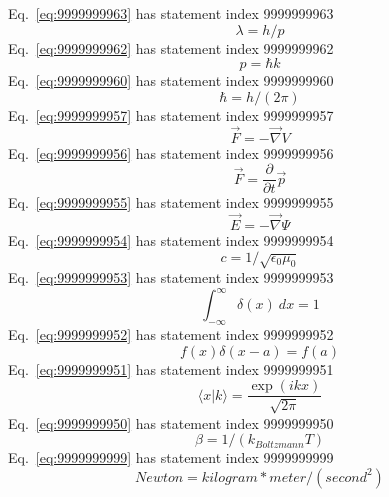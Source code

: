 \documentclass[12pt]{report}
\begin{document}
Eq.~\ref{eq:9999999963} has statement index 9999999963
\begin{equation}
\lambda = h/p
\label{eq:9999999963}
\end{equation}
Eq.~\ref{eq:9999999962} has statement index 9999999962
\begin{equation}
p = \hbar k
\label{eq:9999999962}
\end{equation}
Eq.~\ref{eq:9999999960} has statement index 9999999960
\begin{equation}
\hbar= h/(2 \pi)
\label{eq:9999999960}
\end{equation}
Eq.~\ref{eq:9999999957} has statement index 9999999957
\begin{equation}
\vec{F} = -\vec{\nabla} V
\label{eq:9999999957}
\end{equation}
Eq.~\ref{eq:9999999956} has statement index 9999999956
\begin{equation}
\vec{F} = \frac{\partial}{\partial t}\vec{p}
\label{eq:9999999956}
\end{equation}
Eq.~\ref{eq:9999999955} has statement index 9999999955
\begin{equation}
\vec{E} = -\vec{\nabla} \Psi
\label{eq:9999999955}
\end{equation}
Eq.~\ref{eq:9999999954} has statement index 9999999954
\begin{equation}
c = 1/\sqrt{\epsilon_0 \mu_0}
\label{eq:9999999954}
\end{equation}
Eq.~\ref{eq:9999999953} has statement index 9999999953
\begin{equation}
\int_{-\infty}^{\infty} \delta(x)\ dx = 1
\label{eq:9999999953}
\end{equation}
Eq.~\ref{eq:9999999952} has statement index 9999999952
\begin{equation}
f(x) \delta(x-a) = f(a)
\label{eq:9999999952}
\end{equation}
Eq.~\ref{eq:9999999951} has statement index 9999999951
\begin{equation}
\langle x | k \rangle = \frac{\exp(ikx)}{\sqrt{2\pi}}
\label{eq:9999999951}
\end{equation}
Eq.~\ref{eq:9999999950} has statement index 9999999950
\begin{equation}
\beta = 1/(k_{Boltzmann}T)
\label{eq:9999999950}
\end{equation}
Eq.~\ref{eq:9999999999} has statement index 9999999999
\begin{equation}
Newton = kilogram*meter/(second^2)
\label{eq:9999999999}
\end{equation}
\end{document}
